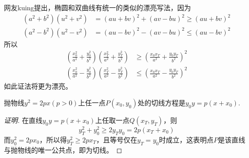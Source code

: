 网友kuing提出，椭圆和双曲线有统一的类似的漂亮写法，因为
\begin{align*}
  (a^2+b^2)(u^2+v^2) & =  (au+bv)^2+(av-bu)^2 \geqslant (au+bv)^2 \\
  (a^2-b^2)(u^2-v^2) & =  (au-bv)^2-(av-bu)^2 \leqslant (au-bv)^2 
\end{align*}
所以
\begin{align*}
  \left( \frac{x_0^2}{a^2}+\frac{y_0^2}{b^2} \right) \left( \frac{x_T^2}{a^2}+\frac{y_T^2}{b^2} \right) & \geqslant  \left( \frac{x_0x_T}{a^2}+\frac{y_0y_T}{b^2} \right)^2 \\
  \left( \frac{x_0^2}{a^2}-\frac{y_0^2}{b^2} \right) \left( \frac{x_T^2}{a^2}-\frac{y_T^2}{b^2} \right) & \leqslant  \left( \frac{x_0x_T}{a^2}-\frac{y_0y_T}{b^2} \right)^2 
\end{align*}
如此证法将更为漂亮。

\begin{theorem}
  抛物线$y^2=2px(p>0)$上任一点$P(x_0,y_0)$处的切线方程是$y_0y=p(x+x_0)$.
\end{theorem}

\begin{proof}[证明]
  在直线$y_0y=p(x+x_0)$上任取一点$Q(x_T,y_T)$，则
  \[ y_T^2+y_0^2 \geqslant 2y_Ty_0=2p(x_T+x_0) \]
  而$y_0^2=2px_0$，所以得$y_T^2 \geqslant 2px_T$，且等号仅在$y_T=y_0$时成立，这表明点$P$是该直线与抛物线的唯一公共点，即为切线。
\end{proof}


